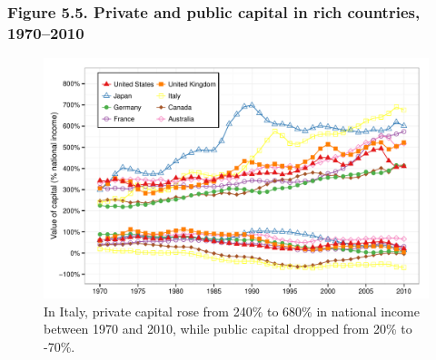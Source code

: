 \documentclass[t]{beamer}\usepackage[]{graphicx}\usepackage[]{color}
\newenvironment{knitrout}{}{} %
\begin{document}
\begin{frame}[label=Figure_5_5]
\frametitle{Figure 5.5. Private and public capital in rich countries, 1970--2010}
\begin{figure}[t]
\begin{minipage}[b]{\textwidth}
\centering
\begin{knitrout}\footnotesize
{}\color{fgcolor}

{\centering \includegraphics[width=1\linewidth]{figures/color/Figure_5_5} 

}



\end{knitrout}
\caption{In Italy, private capital rose from 240\% to 680\% in national income between 1970 and 2010, while public capital dropped from 20\% to -70\%.}
\end{minipage}
\end{figure}
\end{frame}
\end{document}
